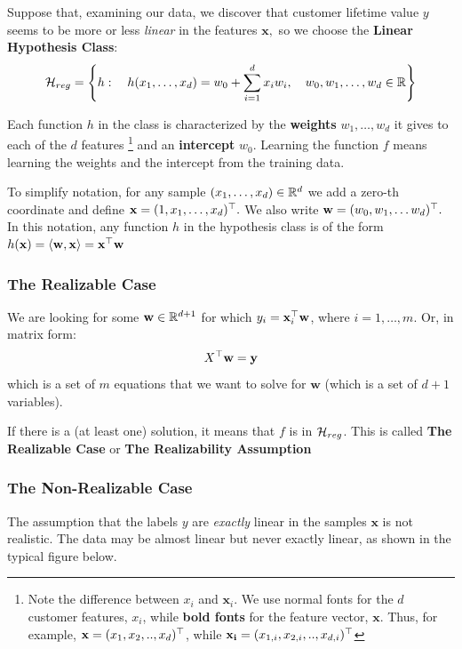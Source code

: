  Suppose that, examining our data, we discover that customer lifetime value $y$ seems to be more or less \textit{linear} in the features $\mathbf{x},$ so we choose the \textbf{Linear Hypothesis Class}:
    \[
 \mathcal{H}_{reg} = \left\{h: \quad h(x_1,\ldots,x_d)= w_0 + \sum_{i=1}^d x_i w_i,  \quad w_0,w_1,\ldots, w_d\in\mathbb{R}
 \right\}
    \]

 Each function $h$ in the class is characterized by the \textbf{weights} $w_1,\ldots,w_d$ it gives to each of the $d$ features
 \footnote{Note the difference between $x_i$ and $\mathbf{x}_i$. We use normal fonts for the $d$ customer features, $x_i$, while \textbf{bold fonts} for the feature vector, $\mathbf{x}.$ Thus, for example, $\mathbf{x}=(x_1,x_2,..,x_d)^{\top}$, while  $\mathbf{x_i}=(x_{1,i},x_{2,i},..,x_{d,i})^{\top}$ }
 and an \textbf{intercept} $w_0$. Learning the function $f$ means learning the weights and the intercept from the training data.
 \vspace{5mm}

 To simplify notation, for any sample $(x_1,\ldots,x_d)\in\mathbb{R}^d$ we add a zero-th coordinate and define $\mathbf{x}=(1,x_1,\ldots,x_d)^{\top}.$ We also write $\mathbf{w}=(w_0,w_1,\ldots w_d)^{\top}.$
 In this notation, any function $h$ in the hypothesis class is of the form $h(\mathbf{x})=\langle \mathbf{w},\mathbf{x} \rangle = \mathbf{x}^{\top} \mathbf{w}$


\subsubsection{The Realizable Case}

We are looking for some $\mathbf{w}\in\mathbb{R}^{d+1}$ for which  $y_i=\mathbf{x}_i^{\top}\mathbf{w}$, where $i=1,\ldots,m$.
Or, in matrix form:
$$X^{\top} \mathbf{w}=\mathbf{y}$$
which is a set of $m$ equations that we want to solve for $\mathbf{w}$ (which is a set of $d+1$ variables).
\vspace{5mm}

If there is a (at least one) solution, it means that  $f$ is in  $\mathcal{H}_{reg}$. This is called \textbf{The Realizable Case} or \textbf{The Realizability Assumption}

\subsubsection{The Non-Realizable Case}

The assumption that the labels $y$ are \textit{exactly} linear in the samples $\mathbf{x}$ is not realistic. The data may be almost linear but never exactly linear, as shown in the typical figure below.


